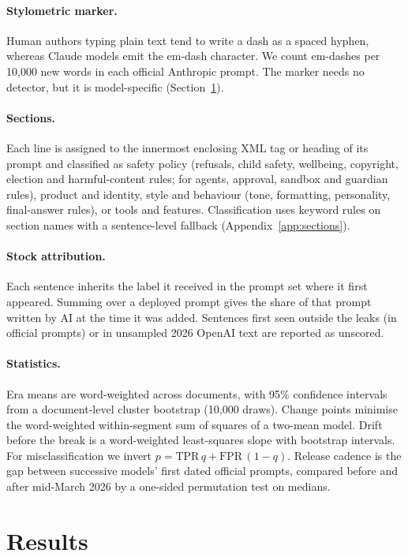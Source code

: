 \documentclass[11pt]{article}
\begin{document}
\paragraph{Stylometric marker.} Human authors typing plain text tend to write a dash as a spaced hyphen, whereas Claude models emit the em-dash character. We count em-dashes per 10{,}000 new words in each official Anthropic prompt. The marker needs no detector, but it is model-specific (Section~\ref{sec:results}).

\paragraph{Sections.} Each line is assigned to the innermost enclosing XML tag or heading of its prompt and classified as safety policy (refusals, child safety, wellbeing, copyright, election and harmful-content rules; for agents, approval, sandbox and guardian rules), product and identity, style and behaviour (tone, formatting, personality, final-answer rules), or tools and features. Classification uses keyword rules on section names with a sentence-level fallback (Appendix~\ref{app:sections}).

\paragraph{Stock attribution.} Each sentence inherits the label it received in the prompt set where it first appeared. Summing over a deployed prompt gives the share of that prompt written by AI at the time it was added. Sentences first seen outside the leaks (in official prompts) or in unsampled 2026 OpenAI text are reported as unscored.

\paragraph{Statistics.} Era means are word-weighted across documents, with 95\% confidence intervals from a document-level cluster bootstrap (10{,}000 draws). Change points minimise the word-weighted within-segment sum of squares of a two-mean model. Drift before the break is a word-weighted least-squares slope with bootstrap intervals. For misclassification we invert $p = \mathrm{TPR}\,q + \mathrm{FPR}\,(1-q)$. Release cadence is the gap between successive models' first dated official prompts, compared before and after mid-March 2026 by a one-sided permutation test on medians.

\section{Results}
\label{sec:results}
\end{document}
